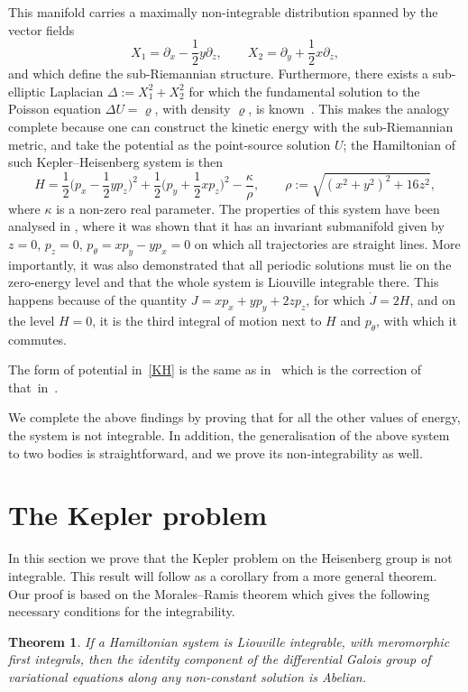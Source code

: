 \documentclass[pdftex]{sigma}
\numberwithin{equation}{section}
\newtheorem{Theorem}{Theorem}[section]
\begin{document}
This manifold carries a maximally non-integrable distribution spanned
by the vector fields
\begin{equation*}
 X_1 = \partial_x - \frac12 y\partial_z,\qquad
 X_2 = \partial_y + \frac12 x\partial_z,
\end{equation*}
and which define the sub-Riemannian structure. Furthermore, there
exists a sub-elliptic Laplacian $\Delta:=X_1^2+X_2^2$ for which the
fundamental solution to the Poisson equation $\Delta U=\varrho$, with density $\varrho$, is known~\cite{Folland}. This makes the analogy complete because one can
construct the kinetic energy with the sub-Riemannian metric, and take
the potential as the point-source solution $U$;
the Hamiltonian of such Kepler--Heisenberg system is then
\begin{equation}
 \label{KH}
 H = \frac12 \bigg(p_x - \frac12 y p_z\bigg)^2 + \frac12\bigg(p_y+\frac12 x p_z\bigg)^2
 - \frac{\kappa}{\rho}, \qquad
 \rho:=\sqrt{(x^2+y^2)^2+{16}z^2},
\end{equation}
where $\kappa$ is a non-zero real parameter. The properties of this
system have been analysed in \cite{dots, 1,2}, where it was shown that it
has an invariant submanifold given by $z=0$, $p_z=0$,
$p_{\theta} = x p_y -y p_x=0$ on which all trajectories are straight
lines. More importantly, it was also demonstrated that all periodic
solutions must lie on the zero-energy level and that the whole system
is Liouville integrable there. This happens because of the quantity
$J=x p_x+ y p_y +2 z p_z$, for which $\dot{J} = 2H$, and on the level
$H=0$, it is the third integral of motion next to $H$ and
$p_{\theta}$, with which it commutes.
\begin{Remark}\label{rem1}
 The form of potential in~\eqref{KH} is the same as in~\cite{dots} which is the correction of that~in~\cite{1}.
\end{Remark}
We complete the above findings by proving that for all the other
values of energy, the system is not integrable. In addition, the generalisation of the above system to two bodies is straightforward, and we prove its non-integrability as well.

\section{The Kepler problem}

In this section we prove that the Kepler problem on the Heisenberg group is not integrable.
This result will follow as a corollary from a more general theorem.
Our proof is based on the Morales--Ramis theorem \cite{Morales:01::b1} which gives
the following necessary conditions for the integrability.
\begin{Theorem} \label{thm:MoRa}
 If a Hamiltonian system is Liouville integrable, with meromorphic
 first integrals, then the identity component of the differential
 Galois group of variational equations along any non-constant
 solution is Abelian.
\end{Theorem}
\end{document}
